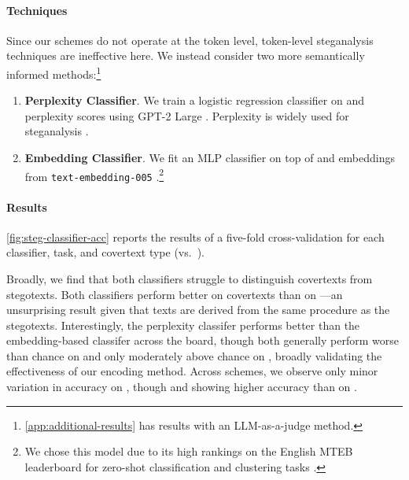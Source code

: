 \paragraph{Techniques}
Since our schemes do not operate at the token level, token-level steganalysis techniques are ineffective here. We instead consider two more semantically informed methods:\footnote{\autoref{app:additional-results} has results with an LLM-as-a-judge method.}
\begin{enumerate}[itemsep=0pt,parsep=1pt]
    \item \textbf{Perplexity Classifier}. We train a logistic regression classifier on \covertext and \stegotext perplexity scores using GPT-2 Large \citep{radford2019language}. Perplexity is widely used for steganalysis \citep[][\emph{i.a.}]{meng2008linguistic,kaptchuk2021meteor}.
    \item \textbf{Embedding Classifier}. We fit an MLP classifier on top of \covertext and \stegotext embeddings from \texttt{text-embedding-005} \citep{lee2024gecko}.\footnote{We chose this model due to its high rankings on the English MTEB leaderboard for zero-shot classification and clustering tasks \citep{muennighoff2023mteb}.}
\end{enumerate}

\paragraph{Results} \autoref{fig:steg-classifier-acc} reports the results of a five-fold cross-validation for each classifier, task, and covertext type (\typeone vs.\ \typetwo). 

Broadly, we find that both classifiers struggle to distinguish covertexts from stegotexts. Both classifiers perform better on \typetwo covertexts than on \typeone---an unsurprising result given that \typeone texts are derived from the same procedure as the stegotexts. Interestingly, the perplexity classifer performs better than the embedding-based classifer across the board, though both generally perform worse than chance on \typeone and only moderately above chance on \typetwo, broadly validating the effectiveness of our encoding method. Across schemes, we observe only minor variation in accuracy on \typeone, though \qa and \sg showing higher accuracy than \lr on \typetwo. 


